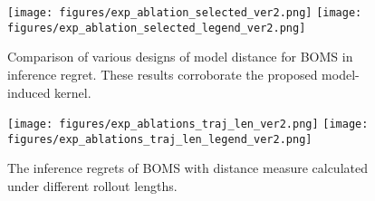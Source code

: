 \begin{figure*}[!htp]
    \centering
    \texttt{[image: figures/exp\_ablation\_selected\_ver2.png]}
    \texttt{[image: figures/exp\_ablation\_selected\_legend\_ver2.png]}
    \caption{Comparison of various designs of model distance for BOMS in inference regret. These results corroborate the proposed model-induced kernel.}
    \label{fig:ablations_selected}
\end{figure*}

\begin{figure}[!ht]
    \centering
    \texttt{[image: figures/exp\_ablations\_traj\_len\_ver2.png]}
    \texttt{[image: figures/exp\_ablations\_traj\_len\_legend\_ver2.png]}
    \caption{The inference regrets of BOMS with distance measure calculated under different rollout lengths.}
    \label{fig:ablations_traj_len}
\end{figure}